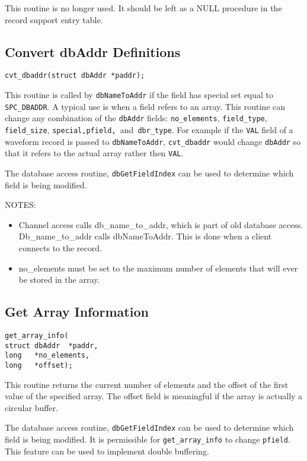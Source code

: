 This routine is no longer used. It should be left as a NULL procedure in the record support entry table.

\subsection{Convert dbAddr Definitions}

\begin{verbatim}cvt_dbaddr(struct dbAddr *paddr);
\end{verbatim}This routine is called by \verb|dbNameToAddr| if the field has special set equal to \verb|SPC_DBADDR|. A typical use is when a field 
refers to an array. This routine can change any combination of the \verb|dbAddr| fields: \verb|no_elements|, \verb|field_type|, 
\verb|field_size|, \verb|special,pfield, |and\verb| dbr_type|. For example if the \verb|VAL| field of a waveform record is passed to 
\verb|dbNameToAddr|, \verb|cvt_dbaddr| would change \verb|dbAddr| so that it refers to the actual array rather then \verb|VAL|.

The database access routine, \verb|dbGetFieldIndex| can be used to determine which field is being modified.

NOTES:

\begin{itemize}\item Channel access calls db\_name\_to\_addr, which is part of old database access. Db\_name\_to\_addr calls 
dbNameToAddr. This is done when a client connects to the record.

\item no\_elements must be set to the maximum number of elements that will ever be stored in the array.

\end{itemize}\subsection{Get Array Information}

\begin{verbatim}get_array_info(
struct dbAddr  *paddr,
long   *no_elements,
long   *offset);
\end{verbatim}This routine returns the current number of elements and the offset of the first value of the specified array. The offset field 
is meaningful if the array is actually a circular buffer.

The database access routine, \verb|dbGetFieldIndex| can be used to determine which field is being modified. It is 
permissible for \verb|get_array_info| to change \verb|pfield|. This feature can be used to implement double buffering.

